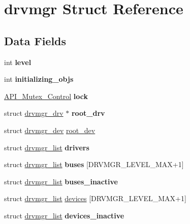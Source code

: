 \hypertarget{structdrvmgr}{}\section{drvmgr Struct Reference}
\label{structdrvmgr}
\subsection*{Data Fields}
\begin{DoxyCompactItemize}
\item 
\mbox{\label{structdrvmgr_a20ce31cdb0d8699bf8b55edccaa95f0f}} 
int {\bfseries level}
\item 
\mbox{\label{structdrvmgr_aa077371aa157550abfe6f5787d722c64}} 
int {\bfseries initializing\+\_\+objs}
\item 
\mbox{\label{structdrvmgr_a7d23dec3aab76c3422fb217796083557}} 
\mbox{\hyperlink{structAPI__Mutex__Control}{A\+P\+I\+\_\+\+Mutex\+\_\+\+Control}} {\bfseries lock}
\item 
\mbox{\label{structdrvmgr_a0d42024d9f8e40235665153e1a663a27}} 
struct \mbox{\hyperlink{structdrvmgr__drv}{drvmgr\+\_\+drv}} $\ast$ {\bfseries root\+\_\+drv}
\item 
struct \mbox{\hyperlink{structdrvmgr__dev}{drvmgr\+\_\+dev}} \mbox{\hyperlink{structdrvmgr_afa6ebd51340a1bc32a8e43b54601252a}{root\+\_\+dev}}
\item 
\mbox{\label{structdrvmgr_a6b8f5eacc567e6092085034adfd31329}} 
struct \mbox{\hyperlink{structdrvmgr__list}{drvmgr\+\_\+list}} {\bfseries drivers}
\item 
\mbox{\label{structdrvmgr_a5efe9053c6ffb1e34b762686e49a9af5}} 
struct \mbox{\hyperlink{structdrvmgr__list}{drvmgr\+\_\+list}} {\bfseries buses} \mbox{[}D\+R\+V\+M\+G\+R\+\_\+\+L\+E\+V\+E\+L\+\_\+\+M\+AX+1\mbox{]}
\item 
\mbox{\label{structdrvmgr_a2ba47494c0208282e5b90a228ce3c445}} 
struct \mbox{\hyperlink{structdrvmgr__list}{drvmgr\+\_\+list}} {\bfseries buses\+\_\+inactive}
\item 
struct \mbox{\hyperlink{structdrvmgr__list}{drvmgr\+\_\+list}} \mbox{\hyperlink{structdrvmgr_a470ba5b09051dcdfe18dd5215f9a4875}{devices}} \mbox{[}D\+R\+V\+M\+G\+R\+\_\+\+L\+E\+V\+E\+L\+\_\+\+M\+AX+1\mbox{]}
\item 
\mbox{\label{structdrvmgr_af458209fc1c44dde9eaaac361ffe2683}} 
struct \mbox{\hyperlink{structdrvmgr__list}{drvmgr\+\_\+list}} {\bfseries devices\+\_\+inactive}
\end{DoxyCompactItemize}



